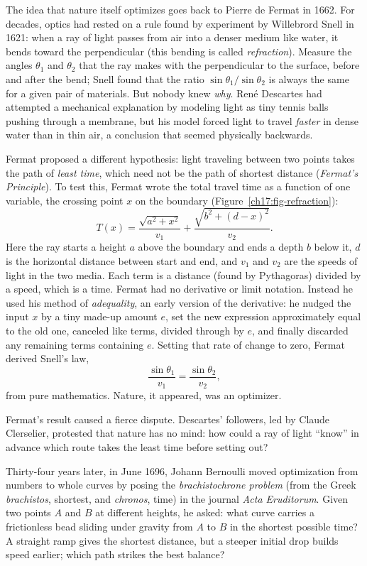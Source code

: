 \begin{historybox}
The idea that nature itself optimizes goes back to Pierre de Fermat in 1662. For
decades, optics had rested on a rule found by experiment by Willebrord Snell in 1621:
when a ray of light passes from air into a denser medium like water, it bends toward
the perpendicular (this bending is called \emph{refraction}). Measure the angles
$\theta_1$ and $\theta_2$ that the ray makes with the perpendicular to the surface,
before and after the bend; Snell found that the ratio $\sin\theta_1/\sin\theta_2$ is
always the same for a given pair of materials. But nobody knew \emph{why}. Ren\'e
Descartes had attempted a mechanical explanation by modeling light as tiny tennis
balls pushing through a membrane, but his model forced light to travel \emph{faster}
in dense water than in thin air, a conclusion that seemed physically backwards.

Fermat proposed a different hypothesis: light traveling between two points takes the
path of \emph{least time}, which need not be the path of shortest distance
(\emph{Fermat's Principle}). To test this, Fermat wrote the total travel time as a
function of one variable, the crossing point $x$ on the boundary
(Figure~\ref{ch17:fig-refraction}):
\[
  T(x) = \frac{\sqrt{a^2+x^2}}{v_1} + \frac{\sqrt{b^2+(d-x)^2}}{v_2}.
\]
Here the ray starts a height $a$ above the boundary and ends a depth $b$ below it, $d$
is the horizontal distance between start and end, and $v_1$ and $v_2$ are the speeds
of light in the two media. Each term is a distance (found by Pythagoras) divided by a
speed, which is a time. Fermat had no derivative or limit notation. Instead he used
his method of \emph{adequality}, an early version of the derivative: he nudged the
input $x$ by a tiny made-up amount $e$, set the new expression approximately equal to
the old one, canceled like terms, divided through by $e$, and finally discarded any
remaining terms containing $e$. Setting that rate of change to zero, Fermat derived
Snell's law,
\[
  \frac{\sin\theta_1}{v_1} = \frac{\sin\theta_2}{v_2},
\]
from pure mathematics. Nature, it appeared, was an optimizer.

Fermat's result caused a fierce dispute. Descartes' followers, led by Claude
Clerselier, protested that nature has no mind: how could a ray of light ``know'' in
advance which route takes the least time before setting out?

Thirty-four years later, in June 1696, Johann Bernoulli moved optimization from
numbers to whole curves by posing the \emph{brachistochrone problem}
(from the Greek \emph{brachistos}, shortest, and \emph{chronos}, time) in the journal
\emph{Acta Eruditorum}. Given two points $A$ and $B$ at different heights, he asked:
what curve carries a frictionless bead sliding under gravity from $A$ to $B$ in the
shortest possible time? A straight ramp gives the shortest distance, but a steeper
initial drop builds speed earlier; which path strikes the best balance?


\end{historybox}
